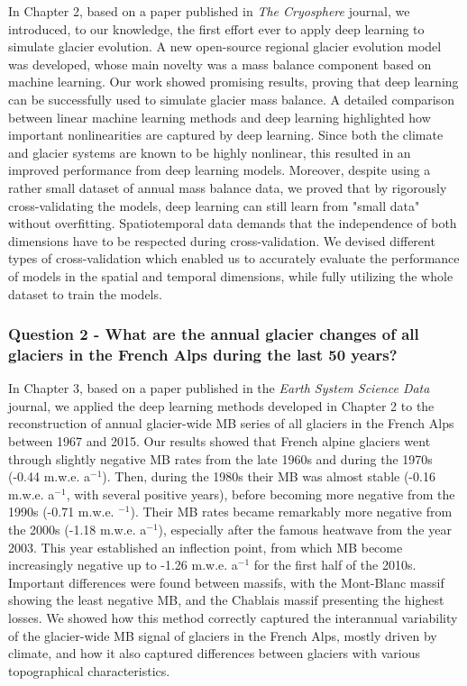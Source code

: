 In Chapter 2, based on a paper published in \textit{The Cryosphere} journal, we introduced, to our knowledge, the first effort ever to apply deep learning to simulate glacier evolution. A new open-source regional glacier evolution model was developed, whose main novelty was a mass balance component based on machine learning. Our work showed promising results, proving that deep learning can be successfully used to simulate glacier mass balance. A detailed comparison between linear machine learning methods and deep learning highlighted how important nonlinearities are captured by deep learning. Since both the climate and glacier systems are known to be highly nonlinear, this resulted in an improved performance from deep learning models. Moreover, despite using a rather small dataset of annual mass balance data, we proved that by rigorously cross-validating the models, deep learning can still learn from "small data" without overfitting. Spatiotemporal data demands that the independence of both dimensions have to be respected during cross-validation. We devised different types of cross-validation which enabled us to accurately evaluate the performance of models in the spatial and temporal dimensions, while fully utilizing the whole dataset to train the models. 

\subsubsection{Question 2 - What are the annual glacier changes of all glaciers in the French Alps during the last 50 years?}

In Chapter 3, based on a paper published in the \textit{Earth System Science Data} journal, we applied the deep learning methods developed in Chapter 2 to the reconstruction of annual glacier-wide MB series of all glaciers in the French Alps between 1967 and 2015. Our results showed that French alpine glaciers went through slightly negative MB rates from the late 1960s and during the 1970s (-0.44 m.w.e. a$^{-1}$). Then, during the 1980s  their MB was almost stable (-0.16 m.w.e. a$^{-1}$, with several positive years), before becoming more negative from the 1990s (-0.71 m.w.e. $^{-1}$). Their MB rates became remarkably more negative from the 2000s (-1.18 m.w.e. a$^{-1}$), especially after the famous heatwave from the year 2003. This year established an inflection point, from which MB become increasingly negative up to -1.26 m.w.e. a$^{-1}$ for the first half of the 2010s. Important differences were found between massifs, with the Mont-Blanc massif showing the least negative MB, and the Chablais massif presenting the highest losses. We showed how this method correctly captured the interannual variability of the glacier-wide MB signal of glaciers in the French Alps, mostly driven by climate, and how it also captured differences between glaciers with various topographical characteristics. 

